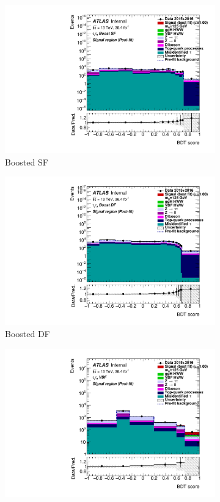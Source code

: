 \begin{figure}[htb]
    \centering
    \begin{subfigure}[t]{0.45\textwidth}
        \includegraphics[width=\textwidth]{./plots/fit/mva/sig_boostsf.pdf}
        \caption{Boosted SF}
    \end{subfigure}
    \begin{subfigure}[t]{0.45\textwidth}
        \includegraphics[width=\textwidth]{./plots/fit/mva/sig_boostdf.pdf}
        \caption{Boosted DF}
    \end{subfigure}
    \begin{subfigure}[t]{0.45\textwidth}
        \includegraphics[width=\textwidth]{./plots/fit/mva/sig_vbf.pdf}

\end{subfigure}
\end{figure}
